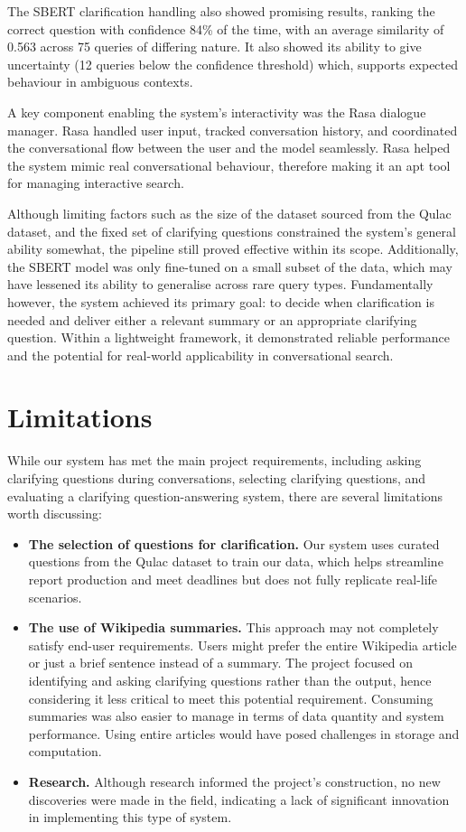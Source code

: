 \documentclass[11pt]{article}
\begin{document}
The SBERT clarification handling also showed promising results, ranking the correct question with confidence 84\% of the time, with an average similarity of 0.563 across 75 queries of differing nature. It also showed its ability to give uncertainty (12 queries below the confidence threshold) which, supports expected behaviour in ambiguous contexts.

A key component enabling the system's interactivity was the Rasa dialogue manager. Rasa handled user input, tracked conversation history, and coordinated the conversational flow between the user and the model seamlessly. Rasa helped the system mimic real conversational behaviour, therefore making it an apt tool for managing interactive search.

Although limiting factors such as the size of the dataset sourced from the Qulac dataset, and the fixed set of clarifying questions constrained the system's general ability somewhat, the pipeline still proved effective within its scope.  Additionally, the SBERT model was only fine-tuned on a small subset of the data, which may have lessened its ability to generalise across rare query types. Fundamentally however, the system achieved its primary goal: to decide when clarification is needed and deliver either a relevant summary or an appropriate clarifying question. Within a lightweight framework, it demonstrated reliable performance and the potential for real-world applicability in conversational search.


\section*{Limitations}
While our system has met the main project requirements, including asking clarifying questions during conversations, selecting clarifying questions, and evaluating a clarifying question-answering system, there are several limitations worth discussing:

\begin{itemize}
    \item \textbf{The selection of questions for clarification.} Our system uses curated questions from the Qulac dataset to train our data, which helps streamline report production and meet deadlines but does not fully replicate real-life scenarios.
    
    \item \textbf{The use of Wikipedia summaries.} This approach may not completely satisfy end-user requirements. Users might prefer the entire Wikipedia article or just a brief sentence instead of a summary. The project focused on identifying and asking clarifying questions rather than the output, hence considering it less critical to meet this potential requirement. Consuming summaries was also easier to manage in terms of data quantity and system performance. Using entire articles would have posed challenges in storage and computation.
    
    \item \textbf{Research.} Although research informed the project's construction, no new discoveries were made in the field, indicating a lack of significant innovation in implementing this type of system.
\end{itemize}
\end{document}
